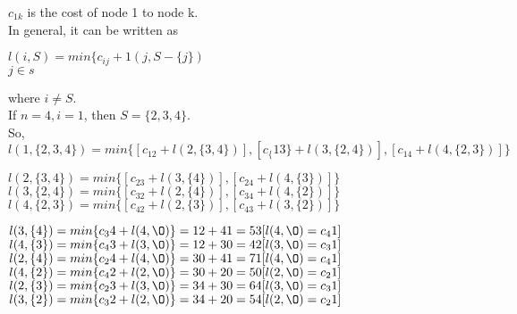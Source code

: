 \documentclass[11pt]{article}
\begin{document}
$c _{1k}$ is the cost of node 1 to node k.\\
\hspace*{0.5cm} In general, it can be written as\\

\begin{center}
  $l(i,S) = min\{c _{ij} + 1 (j,S - \{j\})$ \\
  \hspace*{-0.5mm} \tiny{$j\in s$} \\
\end{center}

\vspace*{0.1cm}
where $i \neq S$.\\
\hspace*{0.5cm} If $n = 4, i = 1$, then $S = \{2, 3, 4\}$.\\
\hspace*{0.5cm} So, $l(1, \{2, 3, 4\}) = min\{[c _{12} + l(2, \{3, 4\})], [c _\{13\} + l(3, \{2, 4\})], [c _{14} + l(4, \{2, 3\})]\}$\\
\vspace*{0.2cm}

\hspace*{1.5cm} $l(2, \{3, 4\}) = min\{[c_23 + l(3, \{4\})], [c_24 + l(4, \{3\})]\}$ \\
\hspace*{1.5cm} $l(3, \{2, 4\}) = min\{[c_32 + l(2, \{4\})], [c_34 + l(4, \{2\})]\}$ \\
\hspace*{1.5cm} $l(4, \{2, 3\}) = min\{[c_42 + l(2, \{3\})], [c_43 + l(3, \{2\})]\}$ \\

\vspace*{0.2cm}

\hspace*{2cm} $l(3, \{4\}) = min\{c_34 + l(4, {\O})\} = 12 + 41 = 53 [l(4, {\O}) = c_41]$ \\
\hspace*{2cm} $l(4, \{3\}) = min\{c_43 + l(3, {\O})\} = 12 + 30 = 42 [l(3, {\O}) = c_31]$ \\
\hspace*{2cm} $l(2, \{4\}) = min\{c_24 + l(4, {\O})\} = 30 + 41 = 71 [l(4, {\O}) = c_41]$ \\
\hspace*{2cm} $l(4, \{2\}) = min\{c_42 + l(2, {\O})\} = 30 + 20 = 50 [l(2, {\O}) = c_21]$ \\
\hspace*{2cm} $l(2, \{3\}) = min\{c_23 + l(3, {\O})\} = 34 + 30 = 64 [l(3, {\O}) = c_31]$ \\
\hspace*{2cm} $l(3, \{2\}) = min\{c_32 + l(2, {\O})\} = 34 + 20 = 54 [l(2, {\O}) = c_21]$ \\
\vspace*{0.2cm}
\end{document}
